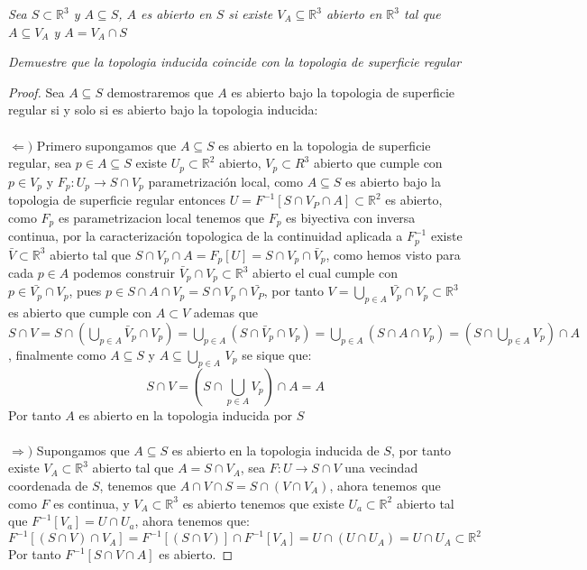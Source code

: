 \documentclass[11pt,letterpaper]{article}
\newcommand{\R}{\mathbb{R}}
\begin{document}
\begin{tcolorbox}[
	title = \textcolor{black}{\textcolor{white}{Topologia inducida }},]
\textit{Sea $S\subset \R^3$ y $A\subseteq S$, $A$ es abierto en $S$ si existe $V_A\subseteq \R^3$ abierto en $\R^3$ tal que $A\subseteq V_A$ y $A=V_A\cap S$}
\end{tcolorbox}


\begin{tcolorbox}[
	title = \textcolor{black}{\textcolor{white}{Problema de punto extra}},]
\textit{Demuestre que la topologia inducida coincide con la topologia de superficie regular}
\end{tcolorbox}
\begin{proof}
    Sea $A\subseteq S$ demostraremos que $A$ es abierto bajo la topologia de superficie regular si y solo si es abierto bajo la topologia inducida:\,\\
    \,\\
    $\Leftarrow)$ Primero supongamos que $A\subseteq S$ es abierto en la topologia de superficie regular, sea $p\in A\subseteq S$ existe $U_p\subset \R^2$ abierto, $V_p\subset R^3$ abierto que cumple con $p\in V_p$ y $F_p:U_p\to S\cap V_p$ parametrizaci\'on local, como $A\subseteq S$ es abierto bajo la topologia 
    de superficie regular entonces $U=F^{-1}[S\cap V_P\cap A]\subset \R^2$ es abierto, como $F_p$ es parametrizacion local tenemos que $F_p$ es biyectiva con  inversa continua, por la caracterizaci\'on topologica de la continuidad aplicada a $F^{-1}_p$ existe $\bar{V}\subset \R^3$ abierto tal que $S\cap V_p\cap A=F_p[U]=S\cap V_p\cap \bar{V}_p$, como hemos visto para cada $p\in A$ podemos construir $\bar{V}_p\cap V_p\subset \R^3$ abierto el cual cumple
    con $p\in \bar{V_p}\cap V_p$, pues $p\in S\cap A\cap V_p =S\cap V_p\cap \bar{V_P}$, por tanto $V=\displaystyle\bigcup_{p\in A}\bar{V_p}\cap V_p\subset \R^3$ es abierto  que cumple con $A\subset V$ ademas que $S\cap V=S\cap\left(\displaystyle\bigcup_{p\in A}\bar{V}_p\cap V_p\right)=\displaystyle\bigcup_{p\in A}(S\cap \bar{V}_p\cap V_p)=\bigcup_{p\in A}(S\cap A\cap V_p)=\left(S\cap\bigcup_{p\in A}V_p\right)\cap A$,
    finalmente como $A\subseteq S$ y $A\subseteq \displaystyle\bigcup_{p\in A}\,V_p$ se sique que:\,\\
    \begin{equation*}
        S\cap V=\left(S\cap\bigcup_{p\in A}V_p\right)\cap A=A
    \end{equation*}
    Por tanto $A$ es abierto en la topologia inducida por $S$\,\\
    \,\\
    $\Rightarrow)$ Supongamos que $A\subseteq S$ es abierto en la topologia inducida de $S$, por tanto existe $V_A\subset \R^3$ abierto tal que $A=S\cap V_A$, sea $F:U\to S\cap V$ una vecindad coordenada de $S$, tenemos que
    $A\cap V\cap S=S\cap(V\cap V_A)$, ahora tenemos que como $F$ es continua, y $V_A\subset \R^3$ es abierto tenemos que existe $U_a\subset \R^2$ abierto tal que $F^{-1}[V_a]=U\cap U_a$, ahora tenemos que:
    \begin{equation*}
        F^{-1}[(S\cap V)\cap V_A]=F^{-1}[(S\cap V)]\cap F^{-1}[V_A]=U\cap(U\cap U_A)=U\cap U_A\subset \R^2
    \end{equation*}
    Por tanto $ F^{-1}[S\cap V\cap A]$ es abierto.
\end{proof}
\end{document}
